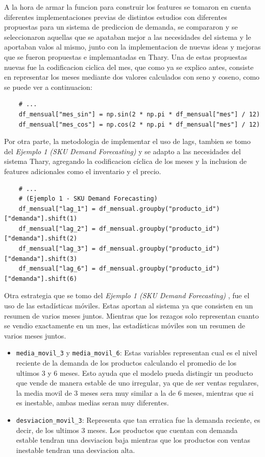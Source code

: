 A la hora de armar la funcion para construir los features se tomaron en cuenta diferentes implementaciones previas de distintos estudios con diferentes propuestas para un sistema de prediccion de demanda, se compararon y se seleccionaron aquellas que se apataban mejor a las necesidades del sistema y le aportaban valos al mismo, junto con la implementacion de nuevas ideas y mejoras que se fueron propuestas e implemantadas en Thary. Una de estas propuestas nuevas fue la codificacion ciclica del mes, que como ya se explico antes, consiste en representar los meses mediante dos valores calculados con seno y coseno, como se puede ver a continuacion:

\begin{verbatim}
    # ...
    df_mensual["mes_sin"] = np.sin(2 * np.pi * df_mensual["mes"] / 12)
    df_mensual["mes_cos"] = np.cos(2 * np.pi * df_mensual["mes"] / 12)
\end{verbatim}

Por otra parte, la metodologia de implementar el uso de lags, tambien se tomo del \textit{Ejemplo 1 (SKU Demand Forecasting)} \cite{ejemplo1_demandforecast} y se adapto a las necesidades del sistema Thary, agregando la codificacion cíclica de los meses y la inclusion de features adicionales como el inventario y el precio.

\begin{verbatim}
    # ... 
    # (Ejemplo 1 - SKU Demand Forecasting)
    df_mensual["lag_1"] = df_mensual.groupby("producto_id")["demanda"].shift(1)
    df_mensual["lag_2"] = df_mensual.groupby("producto_id")["demanda"].shift(2)
    df_mensual["lag_3"] = df_mensual.groupby("producto_id")["demanda"].shift(3)
    df_mensual["lag_6"] = df_mensual.groupby("producto_id")["demanda"].shift(6)
\end{verbatim}

Otra estrategia que se tomo del \textit{Ejemplo 1 (SKU Demand Forecasting)} \cite{ejemplo1_demandforecast}, fue el uso de las estadísticas móviles. Estas aportan al sistema ya que consisten en un resumen de varios meses juntos. Mientras que los rezagos solo representan cuanto se vendio exactamente en un mes, las estadísticas móviles son un resumen de varios meses juntos.

\begin{itemize}
\item \texttt{media\_movil\_3} y \texttt{media\_movil\_6}: Estas variables representan cual es el nivel reciente de la demanda de los productos calculando el promedio de los ultimos 3 y 6 meses. Esto ayuda que el modelo pueda distingir un producto que vende de manera estable de uno irregular, ya que de ser ventas regulares, la media movil de 3 meses sera muy similar a la de 6 meses, mientras que si es inestable, ambas medias seran muy diferentes.
\item \texttt{desviacion\_movil\_3}: Representa que tan erratica fue la demanda reciente, es decir, de los ultimos 3 meses. Los productos que cuentan con demanda estable tendran una desviacion baja mientras que los productos con ventas inestable tendran una desviacion alta.
\end{itemize}

